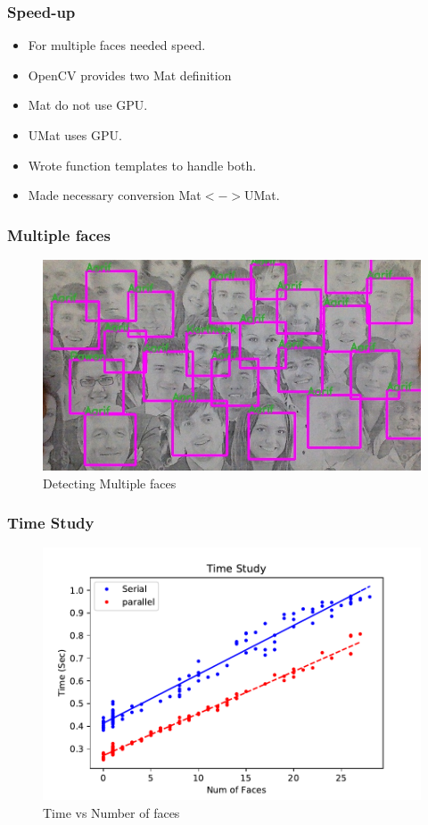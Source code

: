 \documentclass[aspectratio=149]{beamer}
\begin{document}

\begin{frame}
\frametitle{Speed-up}
\begin{itemize}
	\item For multiple faces needed speed.
	\item OpenCV provides two Mat definition
	\item Mat do not use GPU.
	\item UMat uses GPU.
	\item Wrote function templates to handle both.
	\item Made necessary conversion Mat$<->$UMat.
\end{itemize}
\end{frame}


\begin{frame}
\frametitle{Multiple faces}
\begin{figure}
	\centering
	\includegraphics[scale=0.4]{./images/mul.jpg}
	\caption{Detecting Multiple faces}
\end{figure}
\end{frame}


\begin{frame}
\frametitle{Time Study}
\begin{figure}
	\centering
	\includegraphics[scale=0.65]{./images/plot.pdf}
	\caption{Time vs Number of faces}
\end{figure}
\end{frame}
\end{document}
